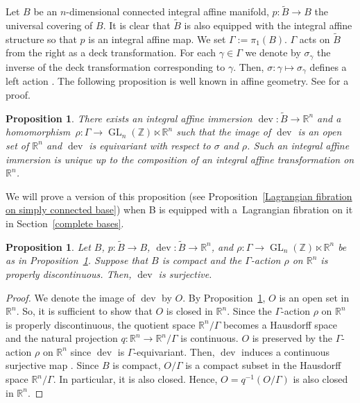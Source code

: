 \documentclass[pdftex]{sigma}
\numberwithin{equation}{section}
\newtheorem{Proposition}[Theorem]{Proposition}
 { \theoremstyle{definition}
\newtheorem{Definition}[Theorem]{Definition}
\newtheorem{Note}[Theorem]{Note}
\newtheorem{Example}[Theorem]{Example}
\newtheorem{Remark}[Theorem]{Remark} }
\newcommand{\R}{\mathbb{R}}
\newcommand{\Z}{\mathbb{Z}}
\renewcommand{\tilde}{\widetilde}
\def\dev{\operatorname{dev}}
\def\Aut{\operatorname{Aut}}
\def\Hom{\operatorname{Hom}}
\def\GL{\operatorname{GL}}
\begin{document}
Let $B$ be an $n$-dimensional connected integral affine manifold, $p\colon \tilde B\to B$ the universal covering of $B$. It is clear that $\tilde B$ is also equipped with the integral affine structure so that $p$ is an integral affine map. We set $\Gamma:=\pi_1(B)$. $\Gamma$ acts on $\tilde B$ from the right as a deck transformation. For each $\gamma \in \Gamma$ we denote by $\sigma_\gamma$ the inverse of the deck transformation corresponding to $\gamma$. Then, $\sigma\colon \gamma\mapsto \sigma_\gamma$ defines a left action \smash{$\sigma\in \Hom\bigl(\Gamma ,\Aut\bigl(\tilde B\bigr)\bigr)$}.
The following proposition is well known in affine geometry. See \cite[p.~641]{GH} for a proof.
\begin{Proposition}\label{developing map}
There exists an integral affine immersion $\dev\colon \tilde B\to \R^n$ and a homomorphism~${\rho\colon \Gamma\to \GL_n(\Z)\ltimes \R^n}$ such that the image of $\dev$ is an open set of $\R^n$ and $\dev$ is equivariant with respect to $\sigma$ and $\rho$. Such an integral affine immersion is unique up to the composition of an integral affine transformation on $\R^n$.
\end{Proposition}
We will prove a version of this proposition (see Proposition~\ref{Lagrangian fibration on simply connected base}) when B is equipped with a~Lagrangian fibration on it in Section~\ref{complete bases}.


\begin{Proposition}
Let $B$, $p\colon \tilde B\to B$, $\dev\colon \tilde B\to \R^n$, and $\rho\colon \Gamma\to \GL_n(\Z)\ltimes \R^n$ be as in Proposition~{\rm\ref{developing map}}. Suppose that $B$ is compact and the $\Gamma$-action $\rho$ on $\R^n$ is properly discontinuous. Then, $\dev$ is surjective.
\end{Proposition}
\begin{proof}
We denote the image of $\dev$ by $O$. By Proposition~\ref{developing map}, $O$ is an open set in $\R^n$. So, it is sufficient to show that $O$ is closed in $\R^n$. Since the $\Gamma$-action $\rho$ on $\R^n$ is properly discontinuous, the quotient space $\R^n /\Gamma$ becomes a Hausdorff space and the natural projection $q\colon \R^n\to \R^n/\Gamma$ is continuous. $O$ is preserved by the $\Gamma$-action $\rho$ on $\R^n$ since $\dev$ is $\Gamma$-equivariant. Then, $\dev$ induces a continuous surjective map \smash{${\overline \dev}\colon B={\tilde B}/\Gamma \to O/\Gamma$}. Since $B$ is compact, $O/\Gamma$ is a compact subset in the Hausdorff space $\R^n/\Gamma$. In particular, it is also closed. Hence, $O=q^{-1}\left( O/\Gamma\right)$ is also closed in $\R^n$.
\end{proof}
\end{document}
